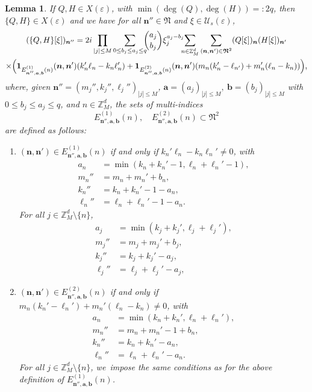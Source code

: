 \documentclass[JEP,XML,SOM,Unicode,published]{cedram}
\theoremstyle{plain}
\newtheorem{lemma}[theorem]{Lemma}
\theoremstyle{definition}
\newcommand{\nb}{{\boldsymbol n}}
\newcommand{\Nb}{{\boldsymbol{\mathfrak{N}}}}
\newcommand{\Z}{\mathbb{Z}}
\newcommand{\1}{\mathbf{1}}
\let\epsilon\varepsilon
\begin{document}
\begin{lemma}\label{lem:bra}
If $Q,H\in X(\epsilon)$, with $\min(\deg(Q),\deg(H))=:2q$, then $\{Q,H\}\in X(\epsilon)$ and we have
for all $\nb''\in\Nb$ and $\xi\in\mathcal{U}_{s}(\epsilon)$,
\begin{multline}
\label{eq:pn}
(\{Q,H\}[\xi])_{\nb''}
= 2i\prod_{|j|\leq M}
\sum_{0\leq b_{j}\leq a_{j}\leq q}\hspace*{-2mm}
\binom{a_{j}}{b_{j}}\xi_{j}^{a_{j}-b_{j}}\hspace*{-2mm}
\sum_{n\in\Z_{M}^{d}}
\sum_{(\nb,\nb')\in \Nb^{2}}
(Q[\xi])_{\nb}(H[\xi])_{\nb'}\\
\times\Big(
\mathbf{1}_{E^{(1)}_{\nb'',\boldsymbol{a},\boldsymbol{b}}(n)}(\nb,\nb')(k_{n}'\ell_{n}-k_{n}\ell_{n}')
+\mathbf{1}_{E^{(2)}_{\nb'',\boldsymbol{a},\boldsymbol{b}}(n)}(\nb,\nb') (m_{n}(k_{n}'-\ell_{n'})+m_{n}'(\ell_{n}-k_{n}))
\Big),
\end{multline}
where, given $\nb''=(m_{j}'',k_{j}'',\ell_{j}'')_{|j|\leq M}$, $\boldsymbol{a}=(a_{j})_{|j|\leq M},\ \boldsymbol{b}=(b_{j})_{|j|\leq M}$ with $0\leq b_{j}\leq a_{j}\leq q$, and $n\in\Z_{M}^{d}$, the sets of multi-indices
\[
E_{\nb'',\boldsymbol{a},\boldsymbol{b}}^{(1)}(n),\quad E_{\nb'',\boldsymbol{a},\boldsymbol{b}}^{(2)}(n) \subset \Nb^2
\]
are defined as follows:
\begin{enumerate}
\item $(\nb,\nb')\in E_{\nb'',\boldsymbol{a},\boldsymbol{b}}^{(1)}(n)$ if and only if $k_n'\ell_n-k_n\ell_n'\neq 0$, with
\begin{align*}
a_{n} &= \min(k_{n}+k_{n}'-1,\ell_{n}+\ell_{n}'-1),\\
\tag*{and}
m_n'' &= m_n+m_n'+b_{n},\\
k_n'' &= k_n+k_n'-1 - a_{n},\\
\ell_n'' &=\ell_n+\ell_n'-1 - a_{n}.
\end{align*}
For all $j\in \Z_{M}^{d}\setminus\{n\}$,
\begin{align*}
a_{j} &= \min(k_{j}+k_{j}',\ell_{j}+\ell_{j}'),\\
\tag*{and}
m_j'' &= m_j+m_j'+b_{j},\\
k_j'' &= k_j+k_j' - a_{j}, \\
\ell_j'' &= \ell_j+\ell_j'- a_{j},
\end{align*}
\item $(\nb,\nb')\in E_{\nb'',\boldsymbol{a},\boldsymbol{b}}^{(2)}(n)$ if and only if $m_{n}(k_{n}'-\ell_{n}')+m_{n}'(\ell_{n}-k_{n})\neq0$, with
\begin{align*}
a_{n} &= \min(k_{n}+k_{n}', \ell_{n}+\ell_{n}'),\\
\tag*{and}
m_n'' &= m_n+m_n'-1+b_{n},\\
k_n'' &= k_n+k_n' -a_{n}, \\
\ell_n''&= \ell_n+\ell_n'-a_{n}.
\end{align*}
For all $j\in\Z_{M}^{d}\setminus\{n\}$, we~impose
the same conditions as for the above definition of $E_{\nb'',\boldsymbol{a},\boldsymbol{b}}^{(1)}(n)$.
\end{enumerate}
\end{lemma}
\end{document}
